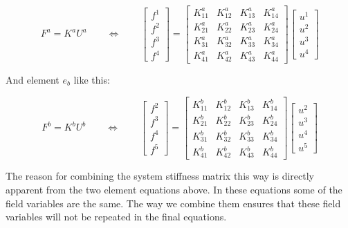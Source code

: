 \begin{equation}
\label{eq:matrix-equation-for-element-a}
F^a = K^a U^a
\qquad \Leftrightarrow \qquad
\begin{bmatrix}
f^1 \\
f^2 \\
f^3 \\
f^4
\end{bmatrix}
=
\begin{bmatrix}
K^a_{11} & K^a_{12} & K^a_{13} & K^a_{14} \\
K^a_{21} & K^a_{22} & K^a_{23} & K^a_{24} \\
K^a_{31} & K^a_{32} & K^a_{33} & K^a_{34} \\
K^a_{41} & K^a_{42} & K^a_{43} & K^a_{44}
\end{bmatrix}
\begin{bmatrix}
u^1 \\
u^2 \\
u^3 \\
u^4
\end{bmatrix}
\end{equation}

And element $e_b$ like this:

\begin{equation}
F^b = K^b U^b
\qquad \Leftrightarrow \qquad
\begin{bmatrix}
f^2 \\
f^3 \\
f^4 \\
f^5
\end{bmatrix}
=
\begin{bmatrix}
K^b_{11} & K^b_{12} & K^b_{13} & K^b_{14} \\
K^b_{21} & K^b_{22} & K^b_{23} & K^b_{24} \\
K^b_{31} & K^b_{32} & K^b_{33} & K^b_{34} \\
K^b_{41} & K^b_{42} & K^b_{43} & K^b_{44}
\end{bmatrix}
\begin{bmatrix}
u^2 \\
u^3 \\
u^4 \\
u^5
\end{bmatrix}
\end{equation}

The reason for combining the system stiffness matrix this way is
directly apparent from the two element equations above. In these
equations some of the field variables are the same. The way we
combine them ensures that these field variables will not be repeated
in the final equations. \newline

